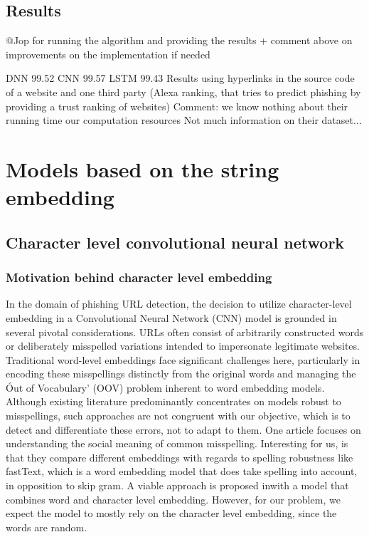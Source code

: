 \documentclass{article}
\begin{document}
    \subsection{Results}\label{subsec:results2}
    @Jop for running the algorithm and providing the results + comment above on improvements on the implementation if needed

    \cite{EfficientDeepLearningPhishingDetection} DNN 99.52
    \cite{EfficientDeepLearningPhishingDetection} CNN 99.57
    \cite{EfficientDeepLearningPhishingDetection} LSTM 99.43
    Results using hyperlinks in the source code of a website and one third party (Alexa ranking, that tries to predict phishing by providing a trust ranking of websites)
    Comment: we know nothing about their running time our computation resources
    Not much information on their dataset...


    \section{Models based on the string embedding}\label{sec:models-based-on-the-string-embedding}

    \subsection{Character level convolutional neural network}\label{subsec:character-level-convolutional-neural-network}

    \subsubsection{Motivation behind character level embedding}

    In the domain of phishing URL detection, the decision to utilize character-level embedding in a Convolutional Neural Network (CNN) model is grounded in several pivotal considerations.
    URLs often consist of arbitrarily constructed words or deliberately misspelled variations intended to impersonate legitimate websites.
    Traditional word-level embeddings face significant challenges here, particularly in encoding these misspellings distinctly from the original words and managing the \'Out of Vocabulary' (OOV) problem inherent to word embedding models.
    Although existing literature predominantly concentrates on models robust to misspellings, such approaches are not congruent with our objective, which is to detect and differentiate these errors, not to adapt to them.
    One article focuses on understanding the social meaning of common misspelling\cite{OOVmispelling}.
    Interesting for us, is that they compare different embeddings with regards to spelling robustness like fastText, which is a word embedding model that does take spelling into account, in opposition to skip gram.
    A viable approach is proposed in\cite{WordCharacterEmbeddings}with a model that combines word and character level embedding.
    However, for our problem, we expect the model to mostly rely on the character level embedding, since the words are random.
\end{document}
